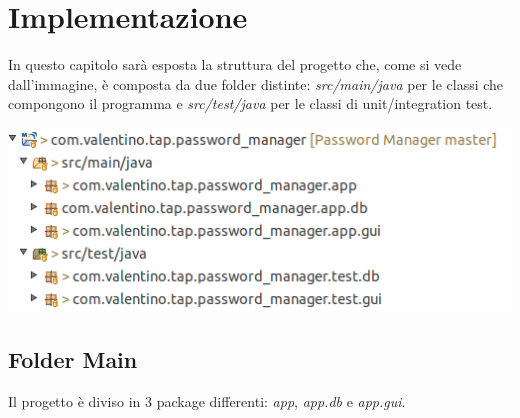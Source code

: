 \chapter{Implementazione}
In questo capitolo sarà esposta la struttura del progetto che, come si vede dall'immagine, è composta da due folder distinte: \textit{src/main/java} per le classi che compongono il programma e \textit{src/test/java} per le classi di unit/integration test.
\begin{center}
	\includegraphics[width=15cm]{Immagini/Struttura.png}
\end{center}
\newpage
\section{Folder Main}
Il progetto è diviso in 3 package differenti: \emph{app}, \emph{app.db} e \emph{app.gui}.
